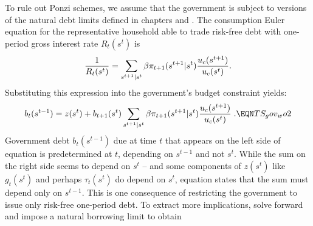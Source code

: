 To rule out Ponzi schemes, we assume that the government is
subject to versions of the natural debt limits defined in chapters
 and .
The consumption Euler equation for the representative household able
to trade risk-free debt with one-period gross interest  rate
$R_t(s^t)$ is
$$
{1 \over R_t(s^t)} = \sum_{s^{t+1}\vert s^t} \beta  \pi_{t+1}(s^{t+1} | s^t)
                        { u_c(s^{t+1}) \over u_c(s^{t}) }.
$$
Substituting this expression into the government's budget constraint
 yields:
$$
 b_t(s^{t-1}) =  z(s^t) + b_{t+1}(s^t) \sum_{s^{t+1}\vert s^t} \beta  \pi_{t+1}(s^{t+1} | s^t)
                        { u_c(s^{t+1}) \over u_c(s^{t}) } \; .  \EQN TS_gov_wo2
$$
Government debt $b_t(s^{t-1})$  due at  time $t$ that appears on the left side of equation    is predetermined at $t$, depending on $s^{t-1}$ and not $s^t$. While the sum on the right side seems to depend on $s^t$ -- and some  components of $z(s^t)$ like $g_t(s^t)$ and perhaps $\tau_t(s^t)$
 do depend on $s^t$,  equation  states that  the sum must
  depend only on $s^{t-1}$.   This is one consequence of restricting the government to issue only risk-free one-period debt.
To extract more implications, solve   forward and impose a natural borrowing limit to obtain
%
%
